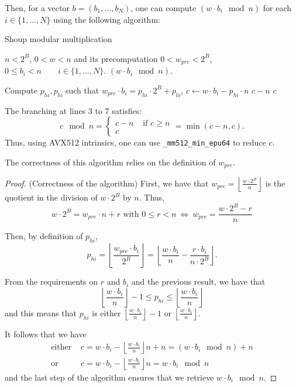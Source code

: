 \documentclass[a4paper]{article}
\begin{document}
Then, for a vector $b = (b_1,\dots, b_N)$, one can compute $(w\cdot b_i \mod n)$ for each $i\in \{1, \dots, N\}$
using the following algorithm:

\begin{algorithm}
    \caption{Shoup modular multiplication}
    \begin{algorithmic}[1]
        \Require $n < 2^B$,
        \Require $0 < w < n$ and its precomputation $0 < w_{pre} < 2^B$,
        \Require $0 \leq b_i < n \qquad i\in \{1, \dots, N\}$.
        \Ensure $(w\cdot b_i \mod n)$.

        \State Compute $p_{hi}, p_{lo}$ such that $w_{pre} \cdot b_i = p_{hi}\cdot 2^B + p_{lo}$, 
        \State $c \gets w\cdot b_i - p_{hi}\cdot n$ 
            \State \Return $c-n$
        \Else
            \State \Return $c$
        \EndIf
    \end{algorithmic}
\end{algorithm}

\begin{remark}
    The branching at lines 3 to 7 satisfies:
    \[
    c \mod n = 
    \left\{
        \begin{array}{ll}
            c - n & \text{ if } c \geq n \\
            c & 
        \end{array}
    \right.
    = \min(c-n, c).
    \]
    Thus, using AVX512 intrinsics, one can use \texttt{\_mm512\_min\_epu64} to reduce $c$.
\end{remark}

\bigskip
The correctness of this algorithm relies on the definition of $w_{pre}$. 

\begin{proof} (Correctness of the algorithm)
First, we have that $w_{pre}= \left\lfloor\frac{w\cdot 2^B}{n}\right\rfloor $ is the quotient in the division 
of $w\cdot 2^B$ by $n$. Thus,
\[
    w\cdot 2^B = w_{pre}\cdot n + r \text{ with } 0 \leq r < n\ \Longleftrightarrow\ w_{pre} = \dfrac{w\cdot 2^B - r}{n}
\]

Then, by definition of $p_{hi}$,
\[
p_{hi} = \left\lfloor\frac{w_{pre}\cdot b_i}{2^B}\right\rfloor
= \left\lfloor\dfrac{w\cdot b_i}{n} - \dfrac{r\cdot b_i}{n\cdot 2^B} \right\rfloor.
\]

From the requirements on $r$ and $b_i$ and the previous result, we have that
\[
\left\lfloor\dfrac{w\cdot b_i}{n}\right\rfloor - 1 \leq p_{hi} \leq \left\lfloor\dfrac{w\cdot b_i}{n}\right\rfloor
\]
and this means that $p_{hi}$ is either $\left\lfloor\frac{w\cdot b_i}{n}\right\rfloor - 1$ or $\left\lfloor\frac{w\cdot b_i}{n}\right\rfloor$.


It follows that we have
\begin{align*}
\text{either } &c=w\cdot b_i - \left\lfloor\frac{w\cdot b_i}{n}\right\rfloor n + n = (w\cdot b_i \mod n)+n \\
\text{or } &c=w\cdot b_i - \left\lfloor\frac{w\cdot b_i}{n}\right\rfloor n = w\cdot b_i \mod n
\end{align*}
and the last step of the algorithm ensures that we retrieve $w\cdot b_i \mod n$.
\end{proof}
\end{document}
